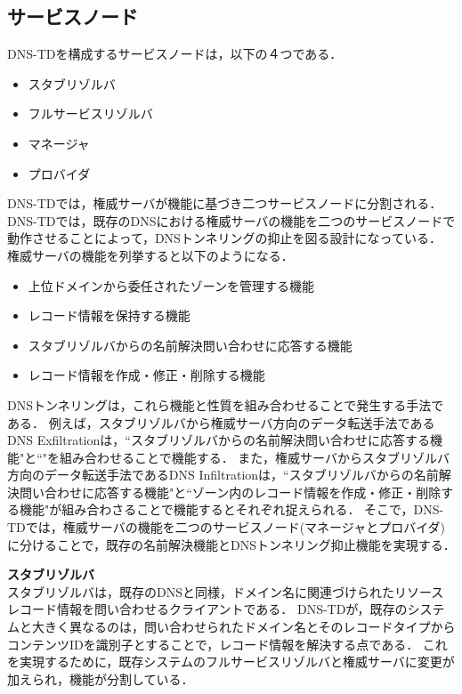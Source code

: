 \subsection{サービスノード}
DNS-TDを構成するサービスノードは，以下の４つである．
\begin{itemize}
 \item スタブリゾルバ
	\vspace{-3mm}
 \item フルサービスリゾルバ
	\vspace{-3mm}
 \item マネージャ
	\vspace{-3mm}
 \item プロバイダ
\end{itemize}

DNS-TDでは，権威サーバが機能に基づき二つサービスノードに分割される．
DNS-TDでは，既存のDNSにおける権威サーバの機能を二つのサービスノードで動作させることによって，DNSトンネリングの抑止を図る設計になっている．
権威サーバの機能を列挙すると以下のようになる．
\begin{itemize}
 \item 上位ドメインから委任されたゾーンを管理する機能
	\vspace{-3mm}
 \item レコード情報を保持する機能
	\vspace{-3mm}
 \item スタブリゾルバからの名前解決問い合わせに応答する機能
	\vspace{-3mm}
 \item レコード情報を作成・修正・削除する機能
\end{itemize}
DNSトンネリングは，これら機能と性質を組み合わせることで発生する手法である．
例えば，スタブリゾルバから権威サーバ方向のデータ転送手法であるDNS Exfiltrationは，``スタブリゾルバからの名前解決問い合わせに応答する機能"と``"を組み合わせることで機能する．
また，権威サーバからスタブリゾルバ方向のデータ転送手法であるDNS Infiltrationは，``スタブリゾルバからの名前解決問い合わせに応答する機能"と``ゾーン内のレコード情報を作成・修正・削除する機能"が組み合わさることで機能するとそれぞれ捉えられる．
そこで，DNS-TDでは，権威サーバの機能を二つのサービスノード(マネージャとプロバイダ)に分けることで，既存の名前解決機能とDNSトンネリング抑止機能を実現する．\newline

\hspace{-12pt}\textbf{スタブリゾルバ}\\
スタブリゾルバは，既存のDNSと同様，ドメイン名に関連づけられたリソースレコード情報を問い合わせるクライアントである．
DNS-TDが，既存のシステムと大きく異なるのは，問い合わせられたドメイン名とそのレコードタイプからコンテンツIDを識別子とすることで，レコード情報を解決する点である．
これを実現するために，既存システムのフルサービスリゾルバと権威サーバに変更が加えられ，機能が分割している．\newline

